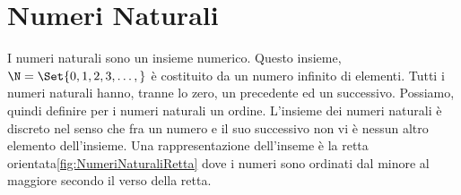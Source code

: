 \chapter{Numeri Naturali}
\label{cha:NumeriNaturali}
I numeri naturali   sono un insieme numerico.  Questo insieme, $\N=\Set{0,1,2,3,\dots,}$ è  costituito da un numero infinito di elementi. Tutti i numeri naturali hanno, tranne lo zero, un precedente ed un successivo. Possiamo, quindi definire per i numeri naturali un ordine.  L'insieme dei numeri naturali è discreto nel senso che fra un numero e il suo successivo non vi è nessun altro elemento dell'insieme. Una rappresentazione dell'inseme  è la retta orientata\nobs\vref{fig:NumeriNaturaliRetta} dove i numeri sono ordinati dal minore al maggiore secondo il verso della retta. 
